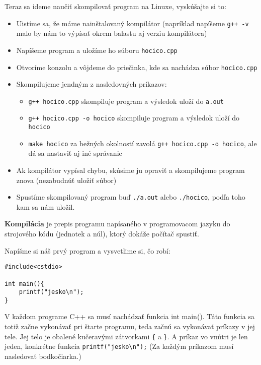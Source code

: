 Teraz sa ideme naučiť skompilovať program na Linuxe, vyskúšajte si to:
\begin{itemize}
    \item Uistíme sa, že máme nainštalovaný kompilátor (napríklad napíšeme \verb!g++ -v! malo by nám to 
    výpísať okrem balastu aj verziu kompilátora)
    \item Napíšeme program a uložíme ho súboru \verb!hocico.cpp!
    \item Otvoríme konzolu a vôjdeme do priečinka, kde sa nachádza súbor \verb!hocico.cpp!
    \item Skompilujeme jendným z nasledovných príkazov:
    \begin{itemize}
        \item \verb!g++ hocico.cpp! skompiluje program a výsledok uloží do \verb!a.out!
        \item \verb!g++ hocico.cpp -o hocico! skompiluje program a výsledok uloží do \verb!hocico!
        \item \verb!make hocico! za bežných okolností zavolá \verb!g++ hocico.cpp -o hocico!, ale dá
        sa nastaviť aj iné správanie
    \end{itemize}
    \item Ak kompilátor vypísal chybu, skúsime ju opraviť a skompilujeme program znova (nezabudnúť uložiť súbor)
    \item Spustíme skompilovaný program buď \verb!./a.out! alebo \verb!./hocico!, podľa toho kam sa nám uložil.
    
\end{itemize}


\textbf{Kompilácia} je prepis programu napísaného v programovacom jazyku do strojového kódu (jednotek a núl),
ktorý dokáže počítač spustiť.


Napíšme si náš prvý program a vysvetlime si, čo robí:
\begin{lstlisting}
#include<cstdio>

int main(){
    printf("jesko\n");
}
\end{lstlisting}

V každom programe C++ sa musí nachádzať funkcia int main(). Táto funkcia sa totiž začne 
vykonávať pri štarte programu, teda začnú sa vykonávať príkazy v jej tele.
Jej telo je obalené kučeravými zátvorkami \verb'{' a \verb'}'. A príkaz vo vnútri je len jeden, konkrétne funkcia
\verb!printf("jesko\n");! (Za každým príkazom musí nasledovať bodkočiarka.)

